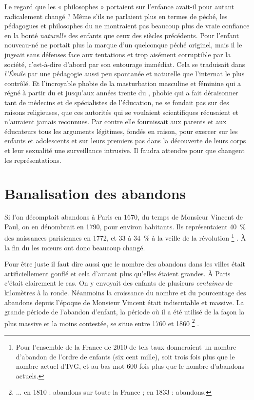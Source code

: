  Le regard que les « {philosophes} » portaient sur l'enfance avait-il pour autant radicalement changé ? Même s'ils ne parlaient plus en termes de péché, les pédagogues et philosophes du  ne montraient pas beaucoup plus de vraie confiance en la bonté \emph{naturelle} des enfants que ceux des siècles précédents. Pour  l'enfant nouveau-né ne portait plus la marque d'un quelconque péché originel, mais il le jugeait sans défenses face aux tentations et trop aisément corruptible par la société, c'est-à-dire d'abord par son entourage immédiat. Cela se traduisait dans \emph{l'Émile} par une pédagogie aussi peu spontanée et naturelle que l'internat le plus contrôlé. Et l'incroyable phobie de la masturbation masculine et féminine qui a régné à partir du  et jusqu'aux années trente du , phobie qui a fait déraisonner tant de médecins et de spécialistes de l'éducation, ne se fondait pas sur des raisons religieuses, que ces autorités qui se voulaient scientifiques récusaient et n'auraient jamais reconnues. Par contre elle fournissait aux parents et aux éducateurs tous les arguments légitimes, fondés en raison, pour exercer sur les enfants et adolescents et sur leurs premiers pas dans la découverte de leurs corps et leur sexualité une surveillance intrusive. Il faudra attendre  pour que changent les représentations.


\section{Banalisation des abandons}

 Si l'on décomptait  abandons à Paris en 1670, du temps de Monsieur Vincent de Paul, on en dénombrait  en 1790, pour environ  habitants. Ils représentaient 40~\% des naissances parisiennes en 1772, et 33 à 34~\% à la veille de la révolution%
\footnote{Pour l'ensemble de la France de 2010 de tels taux donneraient un nombre d'abandon de l'ordre de  enfants (six cent mille), soit trois fois plus que le nombre actuel d'IVG, et au bas mot 600 fois plus que le nombre d'abandons actuels.}%
. À la fin du  les mœurs ont donc beaucoup changé.

 Pour être juste il faut dire aussi que le nombre des abandons dans les villes était artificiellement gonflé et cela d'autant plus qu'elles étaient grandes. À Paris c'était clairement le cas. On y envoyait des enfants de plusieurs \emph{centaines} de kilomètres à la ronde. Néanmoins la croissance du nombre et du pourcentage des abandons depuis l'époque de Monsieur Vincent était indiscutable et massive. La grande période de l'abandon d'enfant, la période où il a été utilisé de la façon la plus massive et la moins contestée, se situe entre 1760 et 1860%
\footnote{... en 1810 :  abandons sur toute la France ; en 1833 :  abandons.}%
.

